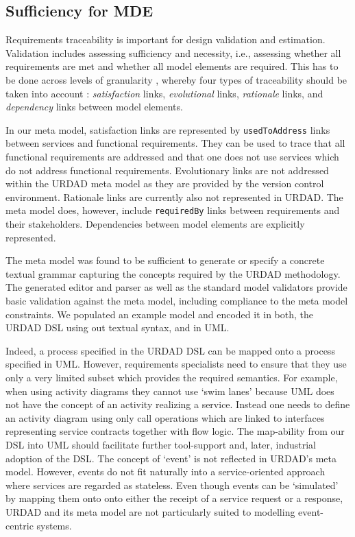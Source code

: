 \subsection{Sufficiency for MDE}
Requirements traceability is important for design validation 
and estimation. Validation includes assessing sufficiency and 
necessity, i.e., assessing whether all requirements are met 
and whether all model elements are required. This has to be 
done across levels of granularity \cite{dick_design_2005},
whereby four types of traceability should be taken into
account \cite{ramesh_toward_2001}: \emph{satisfaction} 
links, \emph{evolutional} links, \emph{rationale} links, 
and \emph{dependency} links between model elements.

In our meta model, satisfaction links are represented by 
\verb+usedToAddress+ links between services and functional 
requirements. They can be used to trace that all functional 
requirements are addressed and that one does not use services 
which do not address functional requirements. Evolutionary 
links are not addressed within the URDAD meta model as they 
are provided by the version control environment. Rationale 
links are currently also not represented in URDAD. The meta 
model does, however, include  \verb+requiredBy+ links between 
requirements and their stakeholders. Dependencies between model 
elements are explicitly represented. 

The meta model was found to be sufficient to generate or specify 
a concrete textual grammar capturing the concepts required by the 
URDAD methodology. The generated editor and parser as well as the 
standard model validators provide basic validation against the 
meta model, including compliance to the meta model constraints. 
We populated an example model and encoded it in both, the URDAD 
DSL using out textual syntax, and in UML.

Indeed, a process specified in the URDAD DSL can be mapped onto 
a process specified in UML. However, requirements specialists 
need to ensure that they use only a very limited subset which 
provides the required semantics. For example, when using activity 
diagrams they cannot use `swim lanes' because UML does not have 
the concept of an activity realizing a service. Instead one needs 
to define an activity diagram using only call operations which 
are linked to interfaces representing service contracts together 
with flow logic. The map-ability from our DSL into UML should
facilitate further tool-support and, later, industrial adoption
of the DSL.
The concept of `event' is not reflected in URDAD's meta model. 
However, events do not fit naturally into a service-oriented 
approach where services are regarded as stateless. Even though 
events can be `simulated' by mapping them onto onto either the 
receipt of a service request or a response, URDAD and its meta 
model are not particularly suited to modelling event-centric 
systems.

